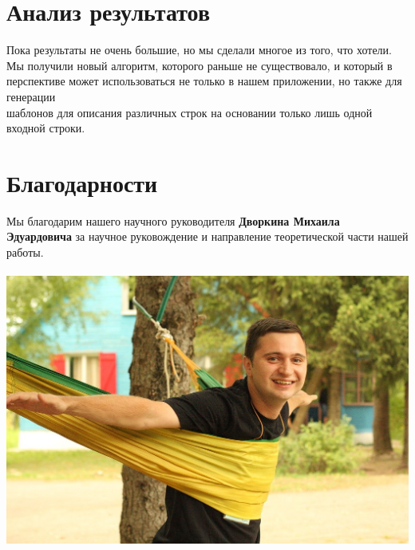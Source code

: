 \documentclass[12pt]{report}
\begin{document}
    \newpage %
\chapter{Анализ результатов}
    Пока результаты не очень большие, но мы сделали многое из того, что хотели. \\
    Мы получили новый алгоритм, которого раньше не существовало, и который в перспективе может использоваться не только в нашем приложении, но также для генерации \\
    шаблонов для описания различных строк на основании только лишь одной входной строки. \\

    

    \newpage %
\chapter{Благодарности}
Мы благодарим нашего научного руководителя { \bf Дворкина Михаила Эдуардовича } за научное руковождение и направление теоретической части нашей работы.
    \\
    \\
    
    \includegraphics[scale=0.5]{dvorkin2.jpg}\hfill
    

        
\end{document}
